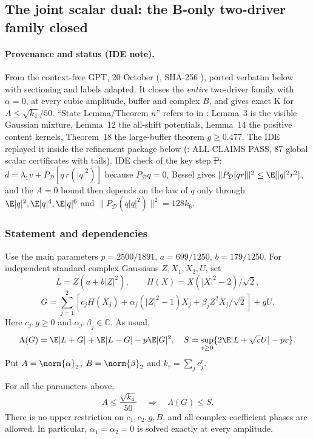 \subsection{The joint scalar dual: the B-only two-driver family closed}\label{sec:k-joint-dual}
\paragraph{Provenance and status (IDE note).} From the context-free GPT, 20 October (, SHA-256
), ported verbatim below with sectioning and labels adapted. It closes the \emph{entire} two-driver family with $\alpha=0$, at every cubic amplitude,
buffer and complex $B$, and gives exact K for $A\le\sqrt{k_4}/50$. ``State Lemma/Theorem $n$'' refers to  in
: Lemma~3 is the visible Gaussian mixture, Lemma~12 the all-shift potentials, Lemma~14 the positive content kernels, Theorem~18 the
large-buffer theorem $g\ge0.477$. The IDE replayed it inside the refinement package below (: ALL CLAIMS PASS, 87 global scalar certificates with tails).
IDE check of the key step \st{P}: $d=\lambda_1v+P_{\mathcal D}[q\,r(|q|^2)]$ because $P_{\mathcal D}q=0$, Bessel gives $\|P_{\mathcal D}[qr]\|^2\le\E[|q|^2r^2]$, and
the $A=0$ bound then depends on the law of $q$ only through $\E|q|^2,\E|q|^4,\E|q|^6$ and $\|P_{\mathcal D}(q|q|^2)\|^2=128k_6$.

\subsubsection{Statement and dependencies}
Use the main parameters $p=2500/1891$, $a=699/1250$, $b=179/1250$.
For independent standard complex Gaussians $Z,X_1,X_2,U$, set
\[
L=Z(a+b|Z|^2),\qquad H(X)=X(|X|^2-2)/\sqrt2,
\]
\[
G=\sum_{j=1}^2\left[c_jH(X_j)+\alpha_j(|Z|^2-1)X_j+
\beta_jZ^2\bar X_j/\sqrt2\right]+gU.
\]
Here $c_j,g\ge0$ and $\alpha_j,\beta_j\in\mathbb C$. As usual,
\[
\Lambda(G)=\E|L+G|+\E|L-G|-p\E|G|^2,\quad
S=\sup_{v\ge0}\{2\E|L+\sqrt vU|-pv\}.
\]
Put $A=\norm{\alpha}_2$, $B=\norm{\beta}_2$ and $k_r=\sum_jc_j^r$.

\begin{theorem}
For all the parameters above,
\[
\boxed{\quad A\le\frac{\sqrt{k_4}}{50}
\quad\Longrightarrow\quad \Lambda(G)\le S.\quad}
\]
There is no upper restriction on $c_1,c_2,g,B$, and all complex
coefficient phases are allowed. In particular, $\alpha_1=\alpha_2=0$
is solved exactly at every amplitude.
\end{theorem}

